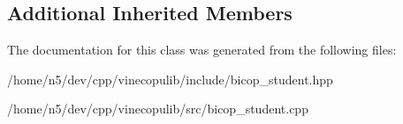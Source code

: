 \subsection*{Additional Inherited Members}


The documentation for this class was generated from the following files\+:\begin{DoxyCompactItemize}
\item 
/home/n5/dev/cpp/vinecopulib/include/bicop\+\_\+student.\+hpp\item 
/home/n5/dev/cpp/vinecopulib/src/bicop\+\_\+student.\+cpp\end{DoxyCompactItemize}
